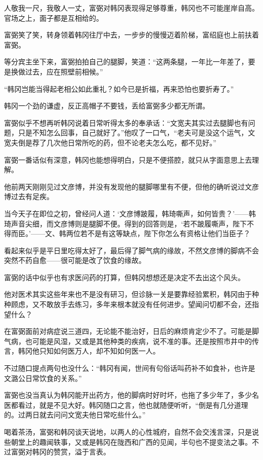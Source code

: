 人敬我一尺，我敬人一丈，富弼对韩冈表现得足够尊重，韩冈也不可能崖岸自高。官场之上，面子都是互相给的。

富弼笑了笑，转身领着韩冈往厅中去，一步步的慢慢迈着阶梯，富绍庭也上前扶着富弼。

等分宾主坐下来，富弼拍拍自己的腿脚，笑道：“这两条腿，一年比一年差了，要是换做过去，应在照壁前相候。”

“韩冈岂能当得起老相公如此重礼？如今已是折福，再来恐怕也要折寿了。”

韩冈一个劲的谦虚，反正高帽子不要钱，丢给富弼多少都无所谓。

富弼似乎不想再听韩冈说着日常听得太多的奉承话：“文宽夫其实过去腿脚也有问题，只是不知怎么回事，自己就好了。”他叹了一口气，“老夫可是没这个运气，文宽夫倒是荐了几次他日常所吃的药，但不论老夫怎么吃，都不见好。”

富弼一番话似有深意，韩冈也能想得明白，只是不便搭腔，就只从字面意思上去理解。

他前两天刚刚见过文彦博，并没有发现他的腿脚哪里有不便，但他的确听说过文彦博过去有足疾。

当今天子在即位之初，曾经问人道：‘文彦博跛履，韩琦嘶声，如何皆贵？’——韩琦声音尖细，而文彦博则是腿脚不便。得到的回答则是，‘若不跛履嘶声，陛下不得而臣。’——文、韩两位若不是有这等缺点，陛下你怎么有资格让他们当臣子？

看起来似乎是平日里吃得太好了，最后得了脚气病的缘故，不然文彦博的脚病不会突然不药自愈——很可能是改了饮食的缘故。

富弼的话中似乎也有求医问药的打算，但韩冈想想还是决定不去出这个风头。

他对医术其实这些年来也不是没有研习，但诊脉一关是要靠经验累积，韩冈由于种种顾虑，又不敢放手去练习，多年来根本就没有任何进步。望闻问切都不会，还指望什么？

在富弼面前对病症说三道四，无论能不能治好，日后的麻烦肯定少不了。可能是脚气病，也可能是风湿，又或是其他种类的疾病，说不准的事。还是按照市井中的传言，韩冈他只知如何医万人，却不知如何医一人。

不过随口提点两句也没什么：“韩冈有闻，世间有句俗话叫药补不如食补，也许是文潞公日常饮食的关系。”

富弼也没当真认为韩冈能开出药方，他的脚病时好时坏，也拖了多少年了，多少名医都看过，就是不见大好。韩冈随口之言，他也就随便听听，“倒是有几分道理的。过两日就去问问文宽夫他日常吃些什么。”

喝着茶汤，富弼和韩冈谈天说地，以两人的心性城府，自然不会交浅言深，只是说些朝堂上的趣闻轶事，又或是韩冈在陇西和广西的见闻，半句也不提变法之事。不过富弼对韩冈的赞赏，溢于言表。

